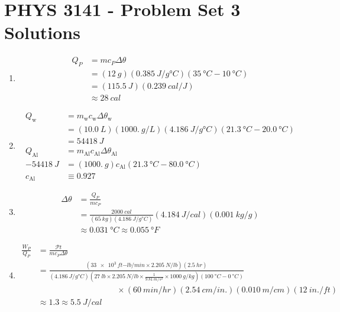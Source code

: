 \documentclass[a4paper,12pt]{article}
\begin{document}
\section*{PHYS 3141 - Problem Set 3 Solutions}

\begin{enumerate}
    \item
        \begin{align*}
            Q_P &= m c_P \Delta \theta \\
            &= (\SI{12}{g}) (\SI{0.385}{J / g \degree C}) (\SI{35}{\degree C} - \SI{10}{\degree C}) \\
            &= (\SI{115.5}{J}) (\SI{0.239}{cal / J}) \\
            &\approx \SI{28}{cal}
        \end{align*}

    \item
        \begin{align*}
            Q_\text{w} &= m_\text{w} c_\text{w} \Delta \theta_\text{w} \\
            &= (\SI{10.0}{L}) (\SI{1000.}{g / L}) (\SI{4.186}{J / g \degree C}) (\SI{21.3}{\degree C} - \SI{20.0}{\degree C}) \\
            &= \SI{54418}{J} \\
            Q_{\text{Al}} &= m_{\text{Al}} c_{\text{Al}} \Delta \theta_{\text{Al}} \\
            \SI{-54418}{J} &= (\SI{1000.}{g}) c_{\text{Al}} (\SI{21.3}{\degree C} - \SI{80.0}{\degree C}) \\
            c_{\text{Al}} &\equiv 0.927
        \end{align*}

    \item
        \begin{align*}
            \Delta \theta &= \frac{Q_P}{m c_P} \\
            &= \frac{\SI{2000}{cal}}{(\SI{65}{kg}) (\SI{4.186}{J / g \degree C})} (\SI{4.184}{J / cal}) (\SI{0.001}{kg / g}) \\
            &\approx \SI{0.031}{\degree C} \approx \SI{0.055}{\degree F}
        \end{align*}

    \item
        \begin{align*}
            \frac{W_P}{Q_P} &= \frac{\mathscr{P}t}{m c_P \Delta \theta} \\
            &= \frac{(\SI{33e3}{ft{-lb}/min} \times \SI{2.205}{N / lb}) (\SI{2.5}{hr})}{(\SI{4.186}{J / g \degree C}) (\SI{27}{lb} \times \SI{2.205}{N / lb} \times \frac{1}{\SI{9.81}{m/s^2}} \times \SI{1000}{g / kg}) (\SI{100}{\degree C} - \SI{0}{\degree C})} \\
            &\hspace{4cm} \times (\SI{60}{min / hr}) (\SI{2.54}{cm / in.}) (\SI{0.010}{m / cm}) (\SI{12}{in. / ft}) \\
            &\approx 1.3 \approx \SI{5.5}{J / cal}
        \end{align*}


\end{enumerate}
\end{document}

